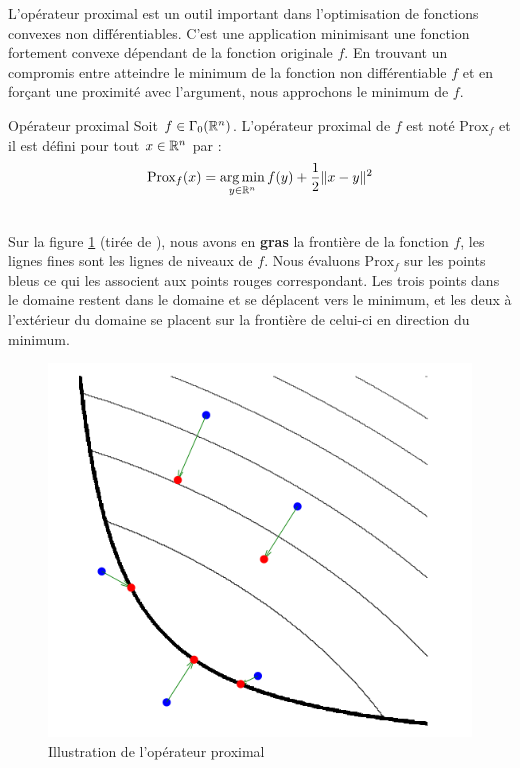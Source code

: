 \documentclass[a4paper,12pt]{article}
\newcommand{\prox}{\text{Prox}}
\begin{document}
L'opérateur proximal est un outil important dans l'optimisation de fonctions convexes non différentiables. C'est une application minimisant une fonction fortement convexe dépendant de la fonction originale $f$. En trouvant un compromis entre atteindre le minimum de la fonction non différentiable $f$ et en forçant une proximité avec l'argument, nous approchons le minimum de $f$. 

\begin{definition}{Opérateur proximal}
Soit $f\in\Gamma_0(\mathbb{R}^n)$. L'opérateur proximal de $f$ est noté $\prox_f$ et il est défini pour tout $x\in\mathbb{R}^n$ par : 
$$
\prox_f(x) = \argmin_{y\in\RR^n} f(y) +\frac{1}{2}\|x-y\|^2
$$
\end{definition}
\\
Sur la figure \ref{fig:proximal} (tirée de \cite{parikh2014proximal}), nous avons en \textbf{gras} la frontière de la fonction $f$, les lignes fines sont les lignes de niveaux de $f$. Nous évaluons $\prox_f$ sur les points bleus ce qui les associent aux points rouges correspondant. Les trois points dans le domaine restent dans le domaine et se déplacent vers le minimum, et les deux à l'extérieur du domaine se placent sur la frontière de celui-ci en direction du minimum. 
\begin{figure}[!h]
\centering
\includegraphics[scale=0.7]{img/proximal.png}
\caption{\label{fig:proximal}Illustration de l'opérateur proximal}
\end{figure}
\end{document}

